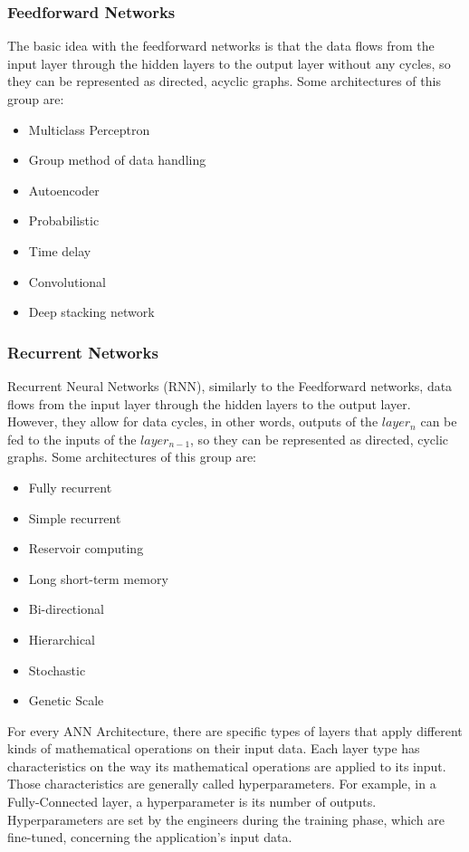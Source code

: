 \subsubsection{Feedforward Networks}
The basic idea with the feedforward networks is that the data flows from the input layer through the hidden layers to the output layer without any cycles, so they can be represented as directed, acyclic graphs. Some architectures of this group are:
\begin{itemize}
	\item Multiclass Perceptron
	\item Group method of data handling
	\item Autoencoder
	\item Probabilistic
	\item Time delay
	\item Convolutional
	\item Deep stacking network
\end{itemize}

\subsubsection{Recurrent Networks}
Recurrent Neural Networks (RNN), similarly to the Feedforward networks, data flows from the input layer through the hidden layers to the output layer. However, they allow for data cycles, in other words, outputs of the $layer_n$ can be fed to the inputs of the $layer_{n-1}$, so they can be represented as directed, cyclic graphs. Some architectures of this group are:
\begin{itemize}
	\item Fully recurrent
	\item Simple recurrent
	\item Reservoir computing
	\item Long short-term memory
	\item Bi-directional
	\item Hierarchical
	\item Stochastic
	\item Genetic Scale
\end{itemize}
For every ANN Architecture, there are specific types of layers that apply different kinds of mathematical operations on their input data. Each layer type has characteristics on the way its mathematical operations are applied to its input. Those characteristics are generally called hyperparameters. For example, in a Fully-Connected layer, a hyperparameter is its number of outputs. Hyperparameters are set by the engineers during the training phase, which are fine-tuned, concerning the application's input data.

